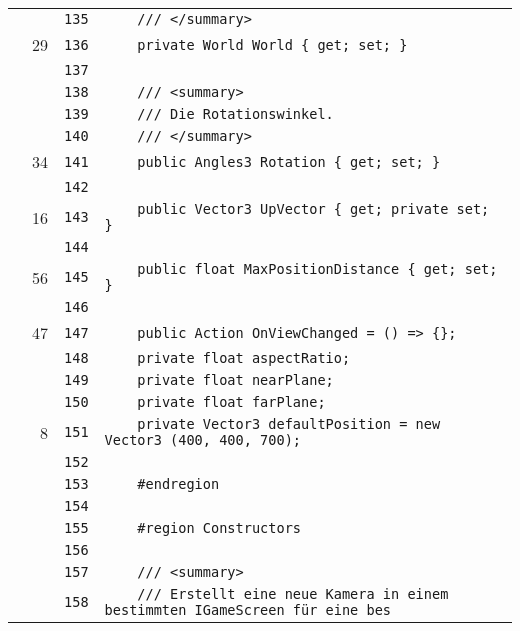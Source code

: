 \documentclass[a4paper,10pt]{article}
\begin{document}
\begin{longtable}[l]{lrrl}
\cellcolor{gray} &  & \verb~135~ & \verb~    /// </summary>~\\
\cellcolor{green} & 29 & \verb~136~ & \verb~    private World World { get; set; }~\\
\cellcolor{gray} &  & \verb~137~ & \verb~~\\
\cellcolor{gray} &  & \verb~138~ & \verb~    /// <summary>~\\
\cellcolor{gray} &  & \verb~139~ & \verb~    /// Die Rotationswinkel.~\\
\cellcolor{gray} &  & \verb~140~ & \verb~    /// </summary>~\\
\cellcolor{green} & 34 & \verb~141~ & \verb~    public Angles3 Rotation { get; set; }~\\
\cellcolor{gray} &  & \verb~142~ & \verb~~\\
\cellcolor{green} & 16 & \verb~143~ & \verb~    public Vector3 UpVector { get; private set; }~\\
\cellcolor{gray} &  & \verb~144~ & \verb~~\\
\cellcolor{green} & 56 & \verb~145~ & \verb~    public float MaxPositionDistance { get; set; }~\\
\cellcolor{gray} &  & \verb~146~ & \verb~~\\
\cellcolor{green} & 47 & \verb~147~ & \verb~    public Action OnViewChanged = () => {};~\\
\cellcolor{gray} &  & \verb~148~ & \verb~    private float aspectRatio;~\\
\cellcolor{gray} &  & \verb~149~ & \verb~    private float nearPlane;~\\
\cellcolor{gray} &  & \verb~150~ & \verb~    private float farPlane;~\\
\cellcolor{green} & 8 & \verb~151~ & \verb~    private Vector3 defaultPosition = new Vector3 (400, 400, 700);~\\
\cellcolor{gray} &  & \verb~152~ & \verb~~\\
\cellcolor{gray} &  & \verb~153~ & \verb~    #endregion~\\
\cellcolor{gray} &  & \verb~154~ & \verb~~\\
\cellcolor{gray} &  & \verb~155~ & \verb~    #region Constructors~\\
\cellcolor{gray} &  & \verb~156~ & \verb~~\\
\cellcolor{gray} &  & \verb~157~ & \verb~    /// <summary>~\\
\cellcolor{gray} &  & \verb~158~ & \verb~    /// Erstellt eine neue Kamera in einem bestimmten IGameScreen für eine bes~\\

\end{longtable}
\end{document}
